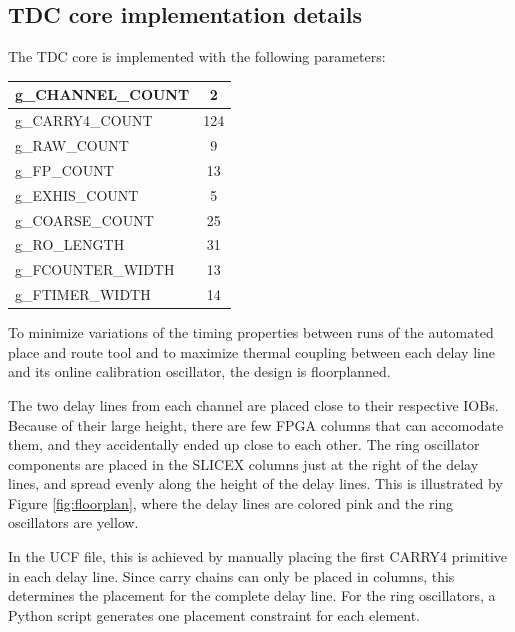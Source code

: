 \documentclass[a4paper,11pt]{article}
\begin{document}
\subsection{TDC core implementation details}
The TDC core is implemented with the following parameters:

\begin{center}
\begin{tabular}{|l|c|}
\hline
g\_CHANNEL\_COUNT & 2 \\
\hline
g\_CARRY4\_COUNT & 124 \\
\hline
g\_RAW\_COUNT & 9 \\
\hline
g\_FP\_COUNT & 13 \\
\hline
g\_EXHIS\_COUNT & 5 \\
\hline
g\_COARSE\_COUNT & 25 \\
\hline
g\_RO\_LENGTH & 31 \\
\hline
g\_FCOUNTER\_WIDTH & 13 \\
\hline
g\_FTIMER\_WIDTH & 14 \\
\hline
\end{tabular}
\end{center}

To minimize variations of the timing properties between runs of the automated place and route tool and to maximize thermal coupling between each delay line and its online calibration oscillator, the design is floorplanned.

The two delay lines from each channel are placed close to their respective IOBs. Because of their large height, there are few FPGA columns that can accomodate them, and they accidentally ended up close to each other. The ring oscillator components are placed in the SLICEX columns just at the right of the delay lines, and spread evenly along the height of the delay lines. This is illustrated by Figure \ref{fig:floorplan}, where the delay lines are colored pink and the ring oscillators are yellow.

In the UCF file, this is achieved by manually placing the first CARRY4 primitive in each delay line. Since carry chains can only be placed in columns, this determines the placement for the complete delay line. For the ring oscillators, a Python script generates one placement constraint for each element.
\end{document}
